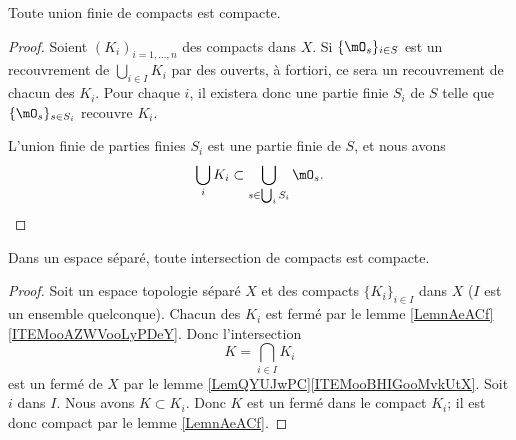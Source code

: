 \begin{lemma}        \label{LEMooFJZDooSxYWVW}
	Toute union finie de compacts est compacte.
\end{lemma}

\begin{proof}
	Soient \( (K_i)_{i=1,\ldots, n}\) des compacts dans \( X\). Si \( \{ \mO_s \}_{i\in S}\) est un recouvrement de \( \bigcup_{i\in I}K_i\) par des ouverts, à fortiori, ce sera un recouvrement de chacun des \( K_i\). Pour chaque \( i\), il existera donc une partie finie \( S_i\) de \( S\) telle que \( \{ \mO_s \}_{s\in S_i}\) recouvre \( K_i\).

	L'union finie de parties finies \( S_i \) est une partie finie de \( S\), et nous avons
	\begin{equation}
		\bigcup_iK_i\subset \bigcup_{s\in \bigcup_iS_i}\mO_s.
	\end{equation}
\end{proof}

\begin{proposition}     \label{PROPooQWHSooXeJOkT}
	Dans un espace séparé, toute intersection de compacts est compacte.
\end{proposition}

\begin{proof}
	Soit un espace topologie séparé \( X\) et des compacts \( \{ K_i \}_{i\in I}\) dans \( X\) (\( I\) est un ensemble quelconque). Chacun des \( K_i\) est fermé par le lemme \ref{LemnAeACf}\ref{ITEMooAZWVooLyPDeY}. Donc l'intersection
	\begin{equation}
		K=\bigcap_{i\in I} K_i
	\end{equation}
	est un fermé de \( X\) par le lemme \ref{LemQYUJwPC}\ref{ITEMooBHIGooMvkUtX}. Soit \( i\) dans \( I\). Nous avons \( K\subset K_i\). Donc \( K\) est un fermé dans le compact \( K_i\); il est donc compact par le lemme \ref{LemnAeACf}.
\end{proof}

